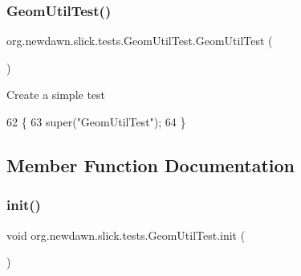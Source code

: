 \subsubsection{\texorpdfstring{Geom\+Util\+Test()}{GeomUtilTest()}}
{\footnotesize\ttfamily org.\+newdawn.\+slick.\+tests.\+Geom\+Util\+Test.\+Geom\+Util\+Test (\begin{DoxyParamCaption}{ }\end{DoxyParamCaption})\hspace{0.3cm}{\ttfamily [inline]}}

Create a simple test 
\begin{DoxyCode}
62                           \{
63         super(\textcolor{stringliteral}{"GeomUtilTest"});
64     \}
\end{DoxyCode}


\subsection{Member Function Documentation}
\mbox{\label{classorg_1_1newdawn_1_1slick_1_1tests_1_1_geom_util_test_ad918b7a75d0de39a5d36d06768a4ae41}} 
\subsubsection{\texorpdfstring{init()}{init()}\hspace{0.1cm}{\footnotesize\ttfamily [1/2]}}
{\footnotesize\ttfamily void org.\+newdawn.\+slick.\+tests.\+Geom\+Util\+Test.\+init (\begin{DoxyParamCaption}{ }\end{DoxyParamCaption})\hspace{0.3cm}{\ttfamily [inline]}}

